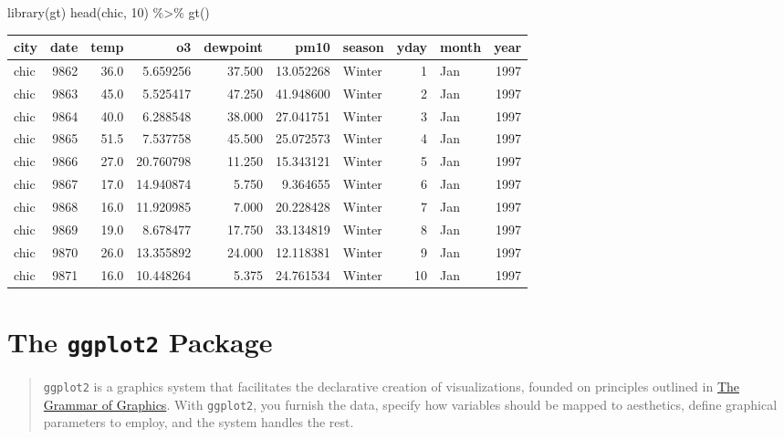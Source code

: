 \documentclass[
  letterpaper,
  DIV=11,
  numbers=noendperiod]{scrreprt}
\newenvironment{Shaded}{\begin{snugshade}}{\end{snugshade}}
\newcommand{\DecValTok}[1]{\textcolor[rgb]{0.68,0.00,0.00}{#1}}
\newcommand{\FunctionTok}[1]{\textcolor[rgb]{0.28,0.35,0.67}{#1}}
\newcommand{\NormalTok}[1]{\textcolor[rgb]{0.00,0.23,0.31}{#1}}
\newcommand{\SpecialCharTok}[1]{\textcolor[rgb]{0.37,0.37,0.37}{#1}}
\begin{document}
\begin{Shaded}
\begin{Highlighting}[]
\FunctionTok{library}\NormalTok{(gt)}
\FunctionTok{head}\NormalTok{(chic, }\DecValTok{10}\NormalTok{) }\SpecialCharTok{\%\textgreater{}\%} \FunctionTok{gt}\NormalTok{()}
\end{Highlighting}
\end{Shaded}

\begin{longtable*}{lrrrrrlrlr}
\toprule
city & date & temp & o3 & dewpoint & pm10 & season & yday & month & year \\ 
\midrule\addlinespace[2.5pt]
chic & 9862 & 36.0 & 5.659256 & 37.500 & 13.052268 & Winter & 1 & Jan & 1997 \\ 
chic & 9863 & 45.0 & 5.525417 & 47.250 & 41.948600 & Winter & 2 & Jan & 1997 \\ 
chic & 9864 & 40.0 & 6.288548 & 38.000 & 27.041751 & Winter & 3 & Jan & 1997 \\ 
chic & 9865 & 51.5 & 7.537758 & 45.500 & 25.072573 & Winter & 4 & Jan & 1997 \\ 
chic & 9866 & 27.0 & 20.760798 & 11.250 & 15.343121 & Winter & 5 & Jan & 1997 \\ 
chic & 9867 & 17.0 & 14.940874 & 5.750 & 9.364655 & Winter & 6 & Jan & 1997 \\ 
chic & 9868 & 16.0 & 11.920985 & 7.000 & 20.228428 & Winter & 7 & Jan & 1997 \\ 
chic & 9869 & 19.0 & 8.678477 & 17.750 & 33.134819 & Winter & 8 & Jan & 1997 \\ 
chic & 9870 & 26.0 & 13.355892 & 24.000 & 12.118381 & Winter & 9 & Jan & 1997 \\ 
chic & 9871 & 16.0 & 10.448264 & 5.375 & 24.761534 & Winter & 10 & Jan & 1997 \\ 
\bottomrule
\end{longtable*}


\chapter{\texorpdfstring{The \texttt{ggplot2}
Package}{The ggplot2 Package}}\label{ggplot}

\begin{quote}
\texttt{ggplot2} is a graphics system that facilitates the declarative
creation of visualizations, founded on principles outlined in
\href{https://link.springer.com/chapter/10.1007/978-3-642-21551-3_13}{The
Grammar of Graphics}. With \texttt{ggplot2}, you furnish the data,
specify how variables should be mapped to aesthetics, define graphical
parameters to employ, and the system handles the rest.
\end{quote}
\end{document}
